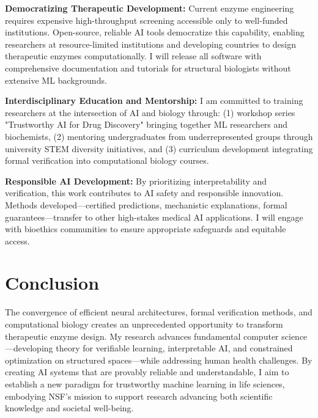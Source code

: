 \documentclass[11pt]{article}
\begin{document}
\textbf{Democratizing Therapeutic Development:} Current enzyme engineering
requires expensive high-throughput screening accessible only to well-funded
institutions. Open-source, reliable AI tools democratize this capability,
enabling researchers at resource-limited institutions and developing countries
to design therapeutic enzymes computationally. I will release all software with
comprehensive documentation and tutorials for structural biologists without
extensive ML backgrounds.

\textbf{Interdisciplinary Education and Mentorship:} I am committed to training
researchers at the intersection of AI and biology through: (1) workshop series
"Trustworthy AI for Drug Discovery" bringing together ML researchers and
biochemists, (2) mentoring undergraduates from underrepresented groups through
university STEM diversity initiatives, and (3) curriculum development
integrating formal verification into computational biology courses.

\textbf{Responsible AI Development:} By prioritizing interpretability and
verification, this work contributes to AI safety and responsible innovation.
Methods developed—certified predictions, mechanistic explanations, formal
guarantees—transfer to other high-stakes medical AI applications. I will engage
with bioethics communities to ensure appropriate safeguards and equitable
access.

\section*{Conclusion}

The convergence of efficient neural architectures, formal verification methods,
and computational biology creates an unprecedented opportunity to transform
therapeutic enzyme design. My research advances fundamental computer
science—developing theory for verifiable learning, interpretable AI, and
constrained optimization on structured spaces—while addressing human health
challenges. By creating AI systems that are provably reliable and
understandable, I aim to establish a new paradigm for trustworthy machine
learning in life sciences, embodying NSF's mission to support research advancing
both scientific knowledge and societal well-being.
\end{document}
